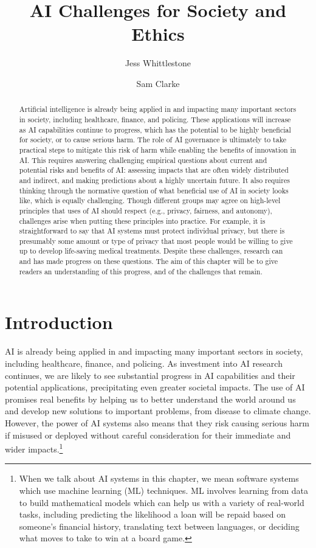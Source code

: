 \documentclass{article}
\title{AI Challenges for Society and Ethics}
\date{}
\author[1,2]{Jess Whittlestone}
\author[1]{Sam Clarke}
\affil[1]{Leverhulme Centre for the Future of Intelligence, University of Cambridge}
\affil[2]{Centre for the Study of Existential Risk, University of Cambridge}
\begin{document}
\maketitle


\begin{abstract}

Artificial intelligence is already being applied in and impacting many important sectors in society, including healthcare, finance, and policing. These applications will increase as AI capabilities continue to progress, which has the potential to be highly beneficial for society, or to cause serious harm. The role of AI governance is ultimately to take practical steps to mitigate this risk of harm while enabling the benefits of innovation in AI. This requires answering challenging empirical questions about current and potential risks and benefits of AI: assessing impacts that are often widely distributed and indirect, and making predictions about a highly uncertain future. It also requires thinking through the normative question of what beneficial use of AI in society looks like, which is equally challenging. Though different groups may agree on high-level principles that uses of AI should respect (e.g., privacy, fairness, and autonomy), challenges arise when putting these principles into practice. For example, it is straightforward to say that AI systems must protect individual privacy, but there is presumably some amount or type of privacy that most people would be willing to give up to develop life-saving medical treatments. Despite these challenges, research can and has made progress on these questions. The aim of this chapter will be to give readers an understanding of this progress, and of the challenges that remain.

\end{abstract}

\tableofcontents

\section{Introduction}

AI is already being applied in and impacting many important sectors in society, including healthcare, finance, and policing. As investment into AI research continues, we are likely to see substantial progress in AI capabilities and their potential applications, precipitating even greater societal impacts. The use of AI promises real benefits by helping us to better understand the world around us and develop new solutions to important problems, from disease to climate change. However, the power of AI systems also means that they risk causing serious harm if misused or deployed without careful consideration for their immediate and wider impacts.\footnote{ When we talk about AI systems in this chapter, we mean software systems which use machine learning (ML) techniques. ML involves learning from data to build mathematical models which can help us with a variety of real-world tasks, including predicting the likelihood a loan will be repaid based on someone’s financial history, translating text between languages, or deciding what moves to take to win at a board game.}
\end{document}
